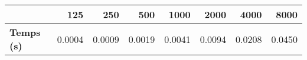 \begin{tabular}{lrrrrrrr}
\toprule
{} &   125  &   250  &   500  &   1000 &   2000 &   4000 &   8000 \\
\midrule
\textbf{Temps (s)} & 0.0004 & 0.0009 & 0.0019 & 0.0041 & 0.0094 & 0.0208 & 0.0450 \\
\bottomrule
\end{tabular}
